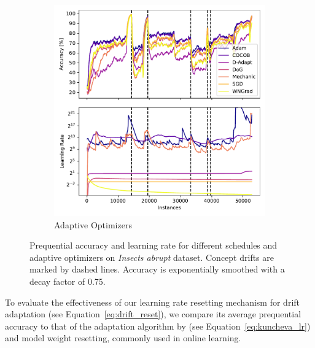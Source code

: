 \documentclass[runningheads]{llncs}
\begin{document}
\begin{figure}[ht]
\begin{subfigure}[b]{0.47\textwidth}
		\includegraphics[width=\textwidth]{figures/lr_norms_optims_insects_abrupt.pdf}
		\caption{Adaptive Optimizers}
		\label{fig:prequential_optims_insects}
	\end{subfigure}
	\caption{Prequential accuracy and learning rate for different schedules and adaptive optimizers on \textit{Insects abrupt} dataset. Concept drifts are marked by dashed lines. Accuracy is exponentially smoothed with a decay factor of 0.75.}
\end{figure}

To evaluate the effectiveness of our learning rate resetting mechanism for drift adaptation (see Equation~\eqref{eq:drift_reset}), we compare its average prequential accuracy to that of the adaptation algorithm by \textcite{kunchevaAdaptiveLearningRate2008} (see Equation~\eqref{eq:kuncheva_lr}) and model weight resetting, commonly used in online learning.
\end{document}
